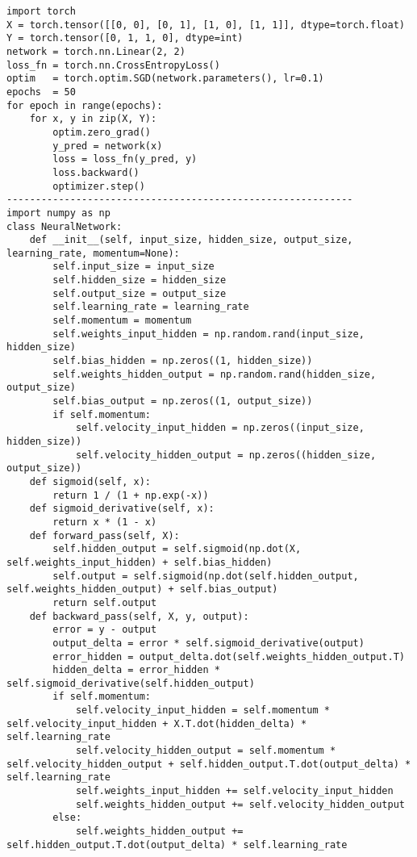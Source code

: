 \documentclass[10pt]{article}
\begin{document}
\begin{multicols*}{3}
\begin{lstlisting}
import torch
X = torch.tensor([[0, 0], [0, 1], [1, 0], [1, 1]], dtype=torch.float)
Y = torch.tensor([0, 1, 1, 0], dtype=int)
network = torch.nn.Linear(2, 2)    
loss_fn = torch.nn.CrossEntropyLoss()         
optim   = torch.optim.SGD(network.parameters(), lr=0.1) 
epochs  = 50                                  
for epoch in range(epochs):
    for x, y in zip(X, Y):
        optim.zero_grad()                     
        y_pred = network(x)                   
        loss = loss_fn(y_pred, y)             
        loss.backward()                     
        optimizer.step()
------------------------------------------------------------
import numpy as np
class NeuralNetwork:
    def __init__(self, input_size, hidden_size, output_size, learning_rate, momentum=None):
        self.input_size = input_size
        self.hidden_size = hidden_size
        self.output_size = output_size
        self.learning_rate = learning_rate
        self.momentum = momentum
        self.weights_input_hidden = np.random.rand(input_size, hidden_size)
        self.bias_hidden = np.zeros((1, hidden_size))
        self.weights_hidden_output = np.random.rand(hidden_size, output_size)
        self.bias_output = np.zeros((1, output_size))
        if self.momentum:
            self.velocity_input_hidden = np.zeros((input_size, hidden_size))
            self.velocity_hidden_output = np.zeros((hidden_size, output_size))
    def sigmoid(self, x):
        return 1 / (1 + np.exp(-x))
    def sigmoid_derivative(self, x):
        return x * (1 - x)
    def forward_pass(self, X):
        self.hidden_output = self.sigmoid(np.dot(X, self.weights_input_hidden) + self.bias_hidden)
        self.output = self.sigmoid(np.dot(self.hidden_output, self.weights_hidden_output) + self.bias_output)
        return self.output
    def backward_pass(self, X, y, output):
        error = y - output
        output_delta = error * self.sigmoid_derivative(output)
        error_hidden = output_delta.dot(self.weights_hidden_output.T)
        hidden_delta = error_hidden * self.sigmoid_derivative(self.hidden_output)
        if self.momentum:
            self.velocity_input_hidden = self.momentum * self.velocity_input_hidden + X.T.dot(hidden_delta) * self.learning_rate
            self.velocity_hidden_output = self.momentum * self.velocity_hidden_output + self.hidden_output.T.dot(output_delta) * self.learning_rate
            self.weights_input_hidden += self.velocity_input_hidden
            self.weights_hidden_output += self.velocity_hidden_output
        else:
            self.weights_hidden_output += self.hidden_output.T.dot(output_delta) * self.learning_rate

\end{lstlisting}
\end{multicols*}
\end{document}
